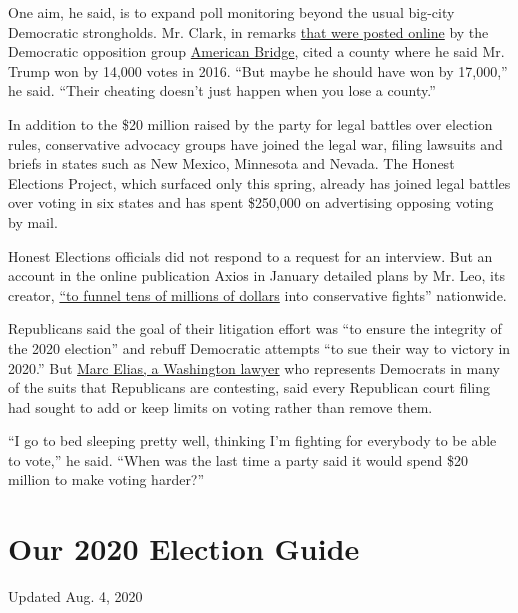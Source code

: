 One aim, he said, is to expand poll monitoring beyond the usual big-city
Democratic strongholds. Mr. Clark, in remarks
\href{https://www.youtube.com/watch?v=am0egba-KNQ}{that were posted
online} by the Democratic opposition group
\href{https://americanbridgepac.org}{American Bridge}, cited a county
where he said Mr. Trump won by 14,000 votes in 2016. ``But maybe he
should have won by 17,000,'' he said. ``Their cheating doesn't just
happen when you lose a county.''

In addition to the \$20 million raised by the party for legal battles
over election rules, conservative advocacy groups have joined the legal
war, filing lawsuits and briefs in states such as New Mexico, Minnesota
and Nevada. The Honest Elections Project, which surfaced only this
spring, already has joined legal battles over voting in six states and
has spent \$250,000 on advertising opposing voting by mail.

Honest Elections officials did not respond to a request for an
interview. But an account in the online publication Axios in January
detailed plans by Mr. Leo, its creator,
\href{https://www.axios.com/leonard-leo-crc-advisors-federalist-society-50d4d844-19a3-4eab-af2b-7b74f1617d1c.html?utm_source=twitter\&utm_medium=twsocialshare\&utm_campaign=organic}{``to
funnel tens of millions of dollars} into conservative fights''
nationwide.

Republicans said the goal of their litigation effort was ``to ensure the
integrity of the 2020 election'' and rebuff Democratic attempts ``to sue
their way to victory in 2020.'' But
\href{https://www.perkinscoie.com/en/professionals/marc-e-elias.html}{Marc
Elias, a Washington lawyer} who represents Democrats in many of the
suits that Republicans are contesting, said every Republican court
filing had sought to add or keep limits on voting rather than remove
them.

``I go to bed sleeping pretty well, thinking I'm fighting for everybody
to be able to vote,'' he said. ``When was the last time a party said it
would spend \$20 million to make voting harder?''

\hypertarget{our-2020-election-guide}{%
\section{Our 2020 Election Guide}\label{our-2020-election-guide}}

Updated Aug. 4, 2020

